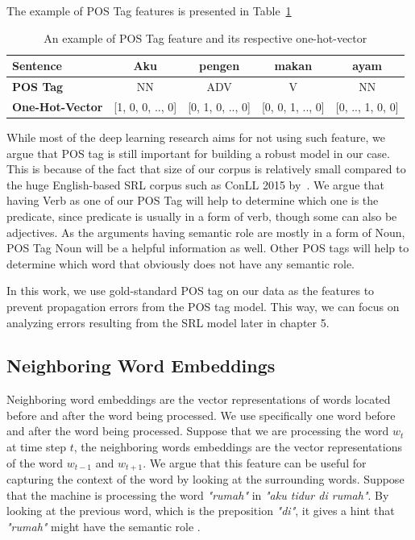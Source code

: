 The example of POS Tag features is presented in Table~\ref{tab:examplepos}
\begin{table}
	\centering
	\caption{An example of POS Tag feature and its respective one-hot-vector}
	\label{tab:examplepos}
	\begin{tabular}{|lcccc|}
		\hline
		\textbf{Sentence} 				& Aku & pengen & makan & ayam \\
		\hline
		\textbf{POS Tag}				& NN & ADV & V & NN  \\
		\hline
		\textbf{One-Hot-Vector}		& [1, 0, 0, .., 0] & [0, 1, 0, .., 0] & [0, 0, 1, .., 0] & [0, .., 1, 0, 0] \\
		\hline
	\end{tabular}
\end{table}

While most of the deep learning research aims for not using such feature, we argue that POS tag is still important for building a robust model in our case. This is because of the fact that size of our corpus is relatively small compared to the huge English-based SRL corpus such as ConLL 2015 by~\cite{carreras2005introduction}. We argue that having Verb as one of our POS Tag will help to determine which one is the predicate, since predicate is usually in a form of verb, though some can also be adjectives. As the arguments having semantic role are mostly in a form of Noun, POS Tag Noun will be a helpful information as well. Other POS tags will help to determine which word that obviously does not have any semantic role.

In this work, we use gold-standard POS tag on our data as the features to prevent propagation errors from the POS tag model. This way, we can focus on analyzing errors resulting from the SRL model later in chapter 5. 

\subsection{Neighboring Word Embeddings}
Neighboring word embeddings are the vector representations of words located before and after the word being processed. We use specifically one word before and after the word being processed. Suppose that we are processing the word $w_{t}$ at time step $t$, the neighboring words embeddings are the vector representations of the word $w_{t-1}$ and $w_{t+1}$. We argue that this feature can be useful for capturing the context of the word by looking at the surrounding words. Suppose that the machine is processing the word \textit{"rumah"} in \textit{"aku tidur di rumah"}. By looking at the previous word, which is the preposition \textit{"di"}, it gives a hint that \textit{"rumah"} might have the semantic role \location.

